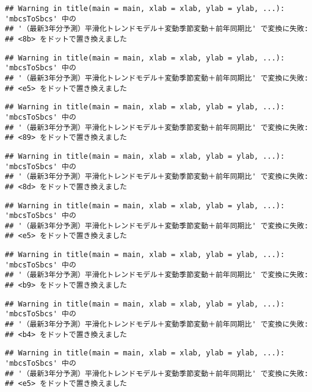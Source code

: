 \documentclass[]{article}
\begin{document}
\begin{verbatim}
## Warning in title(main = main, xlab = xlab, ylab = ylab, ...): 'mbcsToSbcs' 中の
## '（最新3年分予測）平滑化トレンドモデル＋変動季節変動＋前年同期比' で変換に失敗:
## <8b> をドットで置き換えました
\end{verbatim}

\begin{verbatim}
## Warning in title(main = main, xlab = xlab, ylab = ylab, ...): 'mbcsToSbcs' 中の
## '（最新3年分予測）平滑化トレンドモデル＋変動季節変動＋前年同期比' で変換に失敗:
## <e5> をドットで置き換えました
\end{verbatim}

\begin{verbatim}
## Warning in title(main = main, xlab = xlab, ylab = ylab, ...): 'mbcsToSbcs' 中の
## '（最新3年分予測）平滑化トレンドモデル＋変動季節変動＋前年同期比' で変換に失敗:
## <89> をドットで置き換えました
\end{verbatim}

\begin{verbatim}
## Warning in title(main = main, xlab = xlab, ylab = ylab, ...): 'mbcsToSbcs' 中の
## '（最新3年分予測）平滑化トレンドモデル＋変動季節変動＋前年同期比' で変換に失敗:
## <8d> をドットで置き換えました
\end{verbatim}

\begin{verbatim}
## Warning in title(main = main, xlab = xlab, ylab = ylab, ...): 'mbcsToSbcs' 中の
## '（最新3年分予測）平滑化トレンドモデル＋変動季節変動＋前年同期比' で変換に失敗:
## <e5> をドットで置き換えました
\end{verbatim}

\begin{verbatim}
## Warning in title(main = main, xlab = xlab, ylab = ylab, ...): 'mbcsToSbcs' 中の
## '（最新3年分予測）平滑化トレンドモデル＋変動季節変動＋前年同期比' で変換に失敗:
## <b9> をドットで置き換えました
\end{verbatim}

\begin{verbatim}
## Warning in title(main = main, xlab = xlab, ylab = ylab, ...): 'mbcsToSbcs' 中の
## '（最新3年分予測）平滑化トレンドモデル＋変動季節変動＋前年同期比' で変換に失敗:
## <b4> をドットで置き換えました
\end{verbatim}

\begin{verbatim}
## Warning in title(main = main, xlab = xlab, ylab = ylab, ...): 'mbcsToSbcs' 中の
## '（最新3年分予測）平滑化トレンドモデル＋変動季節変動＋前年同期比' で変換に失敗:
## <e5> をドットで置き換えました
\end{verbatim}
\end{document}
